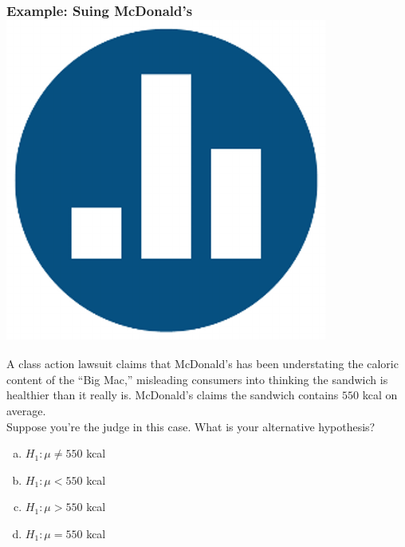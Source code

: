\begin{frame}
\frametitle{Example: Suing McDonald's \hfill \includegraphics[scale = 0.05]{./images/clicker}}

A class action lawsuit claims that McDonald's has been  understating the caloric content of the ``Big Mac,'' misleading consumers into thinking the sandwich is healthier than it really is. McDonald's claims the sandwich contains $550$ kcal on average. \\

\vspace{1em}
\alert{Suppose you're the judge in this case. What is your alternative hypothesis?}

	\begin{enumerate}[(a)]
		\item $H_1\colon \mu \neq 550$ kcal
		\item $H_1\colon \mu < 550$ kcal
		\item $H_1\colon \mu > 550$ kcal
		\item $H_1\colon \mu = 550$ kcal
\end{enumerate}
\end{frame}

